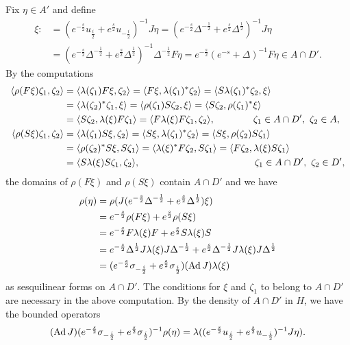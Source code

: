 \documentclass{../../small}
\begin{document}
\begin{pf}
Fix $\eta\in A'$ and define
\begin{align*}
\xi:&=(e^{-\frac s2}u_{\frac i2}+e^{\frac s2}u_{-\frac i2})^{-1}J\eta
=(e^{-\frac s2}\Delta^{-\frac12}+e^{\frac s2}\Delta^{\frac12})^{-1}J\eta\\
&=(e^{-\frac s2}\Delta^{-\frac12}+e^{\frac s2}\Delta^{\frac12})^{-1}\Delta^{-\frac12}F\eta
=e^{-\frac s2}(e^{-s}+\Delta)^{-1}F\eta
\in A\cap D'.
\end{align*}
By the computations
\begin{align*}
\langle\rho(F\xi)\zeta_1,\zeta_2\rangle
&=\langle\lambda(\zeta_1)F\xi,\zeta_2\rangle
=\langle F\xi,\lambda(\zeta_1)^*\zeta_2\rangle
=\langle S\lambda(\zeta_1)^*\zeta_2,\xi\rangle\\
&=\langle\lambda(\zeta_2)^*\zeta_1,\xi\rangle
=\langle\rho(\zeta_1)S\zeta_2,\xi\rangle
=\langle S\zeta_2,\rho(\zeta_1)^*\xi\rangle\\
&=\langle S\zeta_2,\lambda(\xi)F\zeta_1\rangle
=\langle F\lambda(\xi)F\zeta_1,\zeta_2\rangle,\qquad\qquad\zeta_1\in A\cap D',\ \zeta_2\in A,\\
\langle\rho(S\xi)\zeta_1,\zeta_2\rangle
&=\langle\lambda(\zeta_1)S\xi,\zeta_2\rangle
=\langle S\xi,\lambda(\zeta_1)^*\zeta_2\rangle
=\langle S\xi,\rho(\zeta_2)S\zeta_1\rangle\\
&=\langle\rho(\zeta_2)^*S\xi,S\zeta_1\rangle
=\langle\lambda(\xi)^*F\zeta_2,S\zeta_1\rangle
=\langle F\zeta_2,\lambda(\xi)S\zeta_1\rangle\\
&=\langle S\lambda(\xi)S\zeta_1,\zeta_2\rangle,\qquad\qquad\qquad\qquad\qquad\qquad\zeta_1\in A\cap D',\ \zeta_2\in D',
\end{align*}
the domains of $\rho(F\xi)$ and $\rho(S\xi)$ contain $A\cap D'$ and we have
\begin{align*}
\rho(\eta)
&=\rho(J(e^{-\frac s2}\Delta^{-\frac12}+e^{\frac s2}\Delta^{\frac12})\xi)\\
&=e^{-\frac s2}\rho(F\xi)+e^{\frac s2}\rho(S\xi)\\
&=e^{-\frac s2}F\lambda(\xi)F+e^{\frac s2}S\lambda(\xi)S\\
&=e^{-\frac s2}\Delta^{\frac12}J\lambda(\xi)J\Delta^{-\frac12}+e^{\frac s2}\Delta^{-\frac12}J\lambda(\xi)J\Delta^{\frac12}\\
&=(e^{-\frac s2}\sigma_{-\frac i2}+e^{\frac s2}\sigma_{\frac i2})(\operatorname{Ad} J)\lambda(\xi)
\end{align*}
as sesquilinear forms on $A\cap D'$.
The conditions for $\xi$ and $\zeta_1$ to belong to $A\cap D'$ are necessary in the above computation.
By the density of $A\cap D'$ in $H$, we have the bounded operators
\[(\operatorname{Ad} J)(e^{-\frac s2}\sigma_{-\frac i2}+e^{\frac s2}\sigma_{\frac i2})^{-1}\rho(\eta)=\lambda((e^{-\frac s2}u_{\frac i2}+e^{\frac s2}u_{-\frac i2})^{-1}J\eta).\]



\end{pf}
\end{document}
